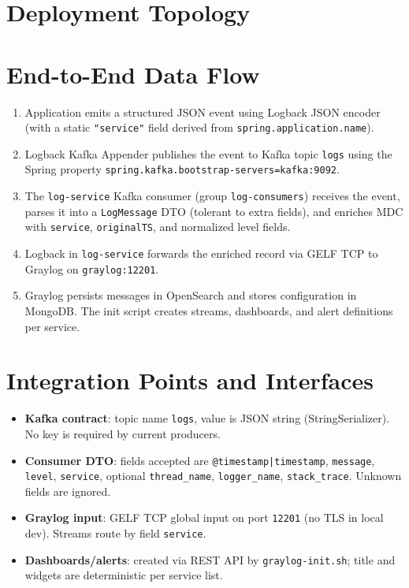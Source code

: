 \documentclass[12pt,a4paper]{report}
\begin{document}
\section{Deployment Topology}
\section{End-to-End Data Flow}
\begin{enumerate}
  \item Application emits a structured JSON event using Logback JSON encoder (with a static \texttt{"service"} field derived from \texttt{spring.application.name}).
  \item Logback Kafka Appender publishes the event to Kafka topic \texttt{logs} using the Spring property \texttt{spring.kafka.bootstrap-servers=kafka:9092}.
  \item The \texttt{log-service} Kafka consumer (group \texttt{log-consumers}) receives the event, parses it into a \texttt{LogMessage} DTO (tolerant to extra fields), and enriches MDC with \texttt{service}, \texttt{originalTS}, and normalized level fields.
  \item Logback in \texttt{log-service} forwards the enriched record via GELF TCP to Graylog on \texttt{graylog:12201}.
  \item Graylog persists messages in OpenSearch and stores configuration in MongoDB. The init script creates streams, dashboards, and alert definitions per service.
\end{enumerate}

\section{Integration Points and Interfaces}
\begin{itemize}[leftmargin=1.2cm]
  \item \textbf{Kafka contract}: topic name \texttt{logs}, value is JSON string (StringSerializer). No key is required by current producers.
  \item \textbf{Consumer DTO}: fields accepted are \texttt{@timestamp|timestamp}, \texttt{message}, \texttt{level}, \texttt{service}, optional \texttt{thread\_name}, \texttt{logger\_name}, \texttt{stack\_trace}. Unknown fields are ignored.
  \item \textbf{Graylog input}: GELF TCP global input on port \texttt{12201} (no TLS in local dev). Streams route by field \texttt{service}.
  \item \textbf{Dashboards/alerts}: created via REST API by \texttt{graylog-init.sh}; title and widgets are deterministic per service list.
\end{itemize}
\end{document}
